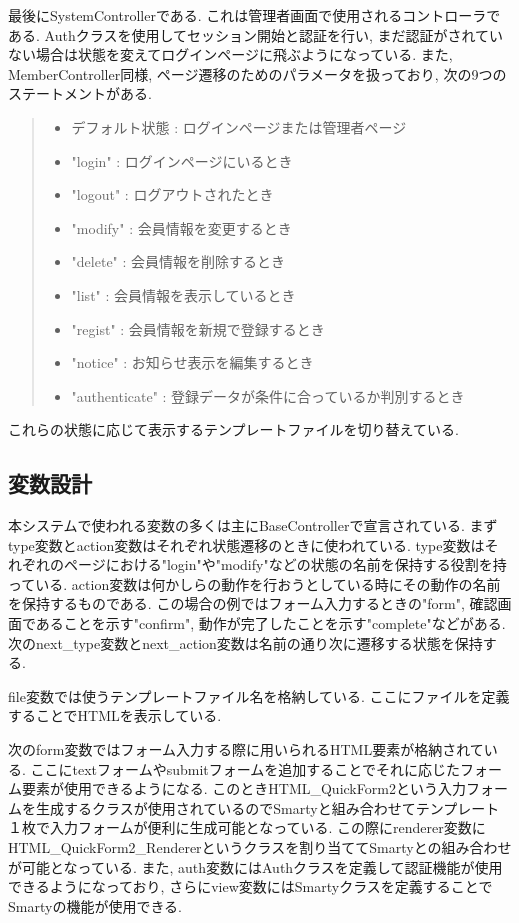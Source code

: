 \documentclass[submit,techrep]{ipsj}
\begin{document}
最後にSystemControllerである. これは管理者画面で使用されるコントローラである. Authクラスを使用してセッション開始と認証を行い, まだ認証がされていない場合は状態を変えてログインページに飛ぶようになっている. 
また, MemberController同様, ページ遷移のためのパラメータを扱っており, 次の9つのステートメントがある.

\begin{quote}
 \begin{itemize}
 \item デフォルト状態 : ログインページまたは管理者ページ
 \item "login" : ログインページにいるとき
 \item "logout" : ログアウトされたとき
 \item "modify" : 会員情報を変更するとき
 \item "delete" : 会員情報を削除するとき
 \item "list" : 会員情報を表示しているとき
 \item "regist" : 会員情報を新規で登録するとき
 \item "notice" : お知らせ表示を編集するとき
 \item "authenticate" : 登録データが条件に合っているか判別するとき
 \end{itemize}
\end{quote}
 
 これらの状態に応じて表示するテンプレートファイルを切り替えている. 

\subsection{変数設計}
本システムで使われる変数の多くは主にBaseControllerで宣言されている. まずtype変数とaction変数はそれぞれ状態遷移のときに使われている. type変数はそれぞれのページにおける"login"や"modify"などの状態の名前を保持する役割を持っている. 
action変数は何かしらの動作を行おうとしている時にその動作の名前を保持するものである. この場合の例ではフォーム入力するときの"form", 確認画面であることを示す"confirm", 動作が完了したことを示す"complete"などがある. 
次のnext\_type変数とnext\_action変数は名前の通り次に遷移する状態を保持する. 

file変数では使うテンプレートファイル名を格納している. ここにファイルを定義することでHTMLを表示している. 

次のform変数ではフォーム入力する際に用いられるHTML要素が格納されている. ここにtextフォームやsubmitフォームを追加することでそれに応じたフォーム要素が使用できるようになる. このときHTML\_QuickForm2という入力フォームを生成するクラスが使用されているのでSmartyと組み合わせてテンプレート１枚で入力フォームが便利に生成可能となっている. 
この際にrenderer変数にHTML\_QuickForm2\_Rendererというクラスを割り当ててSmartyとの組み合わせが可能となっている.  また, auth変数にはAuthクラスを定義して認証機能が使用できるようになっており, さらにview変数にはSmartyクラスを定義することでSmartyの機能が使用できる. 
\end{document}
